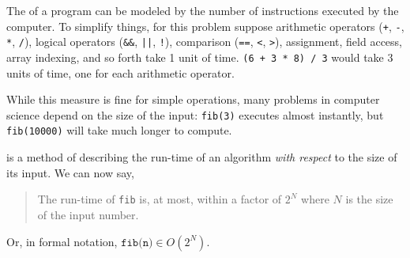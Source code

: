 \begin{blocksection}
The  of a program can be modeled by the number of
instructions executed by the computer. To simplify things, for this problem suppose arithmetic
operators (\lstinline$+$, \lstinline$-$, \lstinline$*$, \lstinline$/$), logical
operators (\lstinline$&&$, \lstinline$||$, \lstinline$!$), comparison
(\lstinline$==$, \lstinline$<$, \lstinline$>$), assignment, field access, array
indexing, and so forth take 1 unit of time. \lstinline$(6 + 3 * 8) / 3$ would
take 3 units of time, one for each arithmetic operator.

While this measure is fine for simple operations, many problems in computer
science depend on the size of the input: \lstinline$fib(3)$ executes almost
instantly, but \lstinline$fib(10000)$ will take much longer to compute.

 is a method of describing the run-time of an
algorithm \emph{with respect} to the size of its input. We can now say,

\begin{quote}
The run-time of \lstinline$fib$ is, at most, within a factor of $2^N$ where $N$
is the size of the input number.
\end{quote}

Or, in formal notation, $\texttt{fib(n)} \in O(2^N)$.
\end{blocksection}
